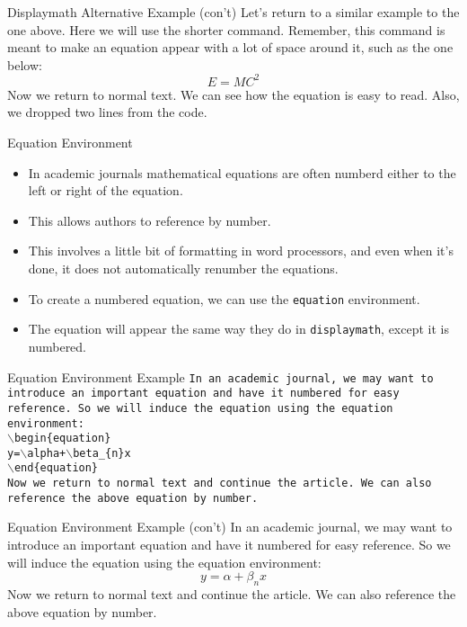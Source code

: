 \documentclass[pdf]{prosper}
\begin{document}
\begin{slide}{Displaymath Alternative Example (con't)}
	Let's return to a similar example to the one above. Here we will use the shorter command. Remember, this command is meant to make an equation appear with a lot of space around it, such as the one below:
	\[E=MC^{2}\]
	Now we return to normal text. We can see how the equation is easy to read. Also, we dropped two lines from the code.
\end{slide}
\begin{slide}{Equation Environment}
	\begin{itemize}
		\item In academic journals mathematical equations are often numberd either to the left or right of the equation.
		\item This allows authors to reference by number.
		\item This involves a little bit of formatting in word processors, and even when it's done, it does not automatically renumber the equations.
		\item To create a numbered equation, we can use the \texttt{equation} environment.
		\item The equation will appear the same way they do in \texttt{displaymath}, except it is numbered.
	\end{itemize}
\end{slide}
\begin{slide}{Equation Environment Example}
	\texttt{In an academic journal, we may want to introduce an important equation and have it numbered for easy reference. So we will induce the equation using the equation environment:} \\
	\texttt{$\backslash$begin\{equation\}} \\
	\texttt{y=$\backslash$alpha+$\backslash$beta\_\{n\}x} \\
	\texttt{$\backslash$end\{equation\}} \\
	\texttt{Now we return to normal text and continue the article. We can also reference the above equation by number.}
\end{slide}
\begin{slide}{Equation Environment Example (con't)}
	In an academic journal, we may want to introduce an important equation and have it numbered for easy reference. So we will induce the equation using the equation environment:
	\begin{equation}
	y=\alpha+\beta_{n}x
	\end{equation}
	Now we return to normal text and continue the article. We can also reference the above equation by number.
\end{slide}
\end{document}
